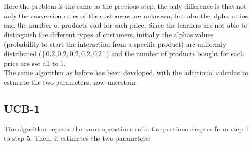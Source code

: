 Here the problem is the same as the previous step, the only difference is that not only the conversion rates of the customers are unknown, but also the alpha ratios and the number of products sold for each price.
Since the learners are not able to distinguish the different types of customers, initially the alphas values (probability to start the interaction from a specific product) are uniformly distributed ($[0.2, 0.2, 0.2, 0.2, 0.2]$) and the number of products bought for each price are set all to 1.\\
The same algorithm as before has been developed, with the additional calculus to estimate the two parameters, now uncertain.

\subsection{UCB-1}
The algorithm repeats the same operations as in the previous chapter from step 1 to step 5. Then, it estimates the two parameters:

